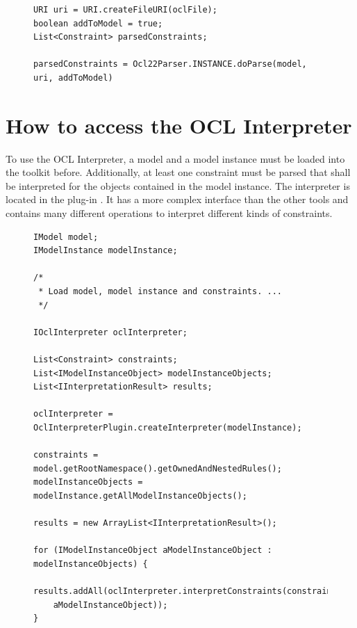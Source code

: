 \begin{figure}[!b]
\begin{lstlisting}[caption={How to parse constraints.}, captionpos=b, label=lst:integration:parserConstraints]
URI uri = URI.createFileURI(oclFile);
boolean addToModel = true;
List<Constraint> parsedConstraints;

parsedConstraints = Ocl22Parser.INSTANCE.doParse(model, uri, addToModel)
\end{lstlisting}
\end{figure}



\section{How to access the OCL Interpreter}

To use the OCL Interpreter, a model and a model instance must be loaded into the
toolkit before. Additionally, at least one constraint must be parsed that shall
be interpreted for the objects contained in the model instance. The interpreter
is located in the plug-in
. It has a more
complex interface than the other tools and contains many different operations
to interpret different kinds of constraints.

\begin{figure}[!b]
\begin{lstlisting}[caption={How to interpret constraints.}, captionpos=b, label=lst:integration:interpretConstraints]
IModel model;
IModelInstance modelInstance;

/*
 * Load model, model instance and constraints. ...
 */

IOclInterpreter oclInterpreter;

List<Constraint> constraints;
List<IModelInstanceObject> modelInstanceObjects;
List<IInterpretationResult> results;

oclInterpreter = OclInterpreterPlugin.createInterpreter(modelInstance);

constraints = model.getRootNamespace().getOwnedAndNestedRules();
modelInstanceObjects = modelInstance.getAllModelInstanceObjects();

results = new ArrayList<IInterpretationResult>();

for (IModelInstanceObject aModelInstanceObject : modelInstanceObjects) {
  results.addAll(oclInterpreter.interpretConstraints(constraints,
  	aModelInstanceObject));
}
\end{lstlisting}
\end{figure}

